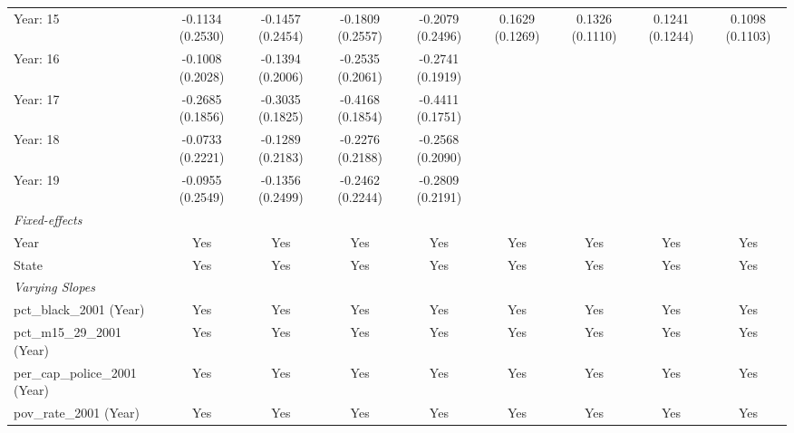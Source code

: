 \begin{tabular}{lcccccccc}
   Year: 15                            & -0.1134 (0.2530) & -0.1457 (0.2454) & -0.1809 (0.2557) & -0.2079 (0.2496) & 0.1629 (0.1269)  & 0.1326 (0.1110)  & 0.1241 (0.1244)  & 0.1098 (0.1103)\\   
   Year: 16                            & -0.1008 (0.2028) & -0.1394 (0.2006) & -0.2535 (0.2061) & -0.2741 (0.1919) &                  &                  &                  &   \\   
   Year: 17                            & -0.2685 (0.1856) & -0.3035 (0.1825) & -0.4168 (0.1854) & -0.4411 (0.1751) &                  &                  &                  &   \\   
   Year: 18                            & -0.0733 (0.2221) & -0.1289 (0.2183) & -0.2276 (0.2188) & -0.2568 (0.2090) &                  &                  &                  &   \\   
   Year: 19                            & -0.0955 (0.2549) & -0.1356 (0.2499) & -0.2462 (0.2244) & -0.2809 (0.2191) &                  &                  &                  &   \\   
   \midrule
   \emph{Fixed-effects}\\
   Year                                & Yes              & Yes              & Yes              & Yes              & Yes              & Yes              & Yes              & Yes\\  
   State                               & Yes              & Yes              & Yes              & Yes              & Yes              & Yes              & Yes              & Yes\\  
   \midrule
   \emph{Varying Slopes}\\
   pct\_black\_2001 (Year)             & Yes              & Yes              & Yes              & Yes              & Yes              & Yes              & Yes              & Yes\\  
   pct\_m15\_29\_2001 (Year)           & Yes              & Yes              & Yes              & Yes              & Yes              & Yes              & Yes              & Yes\\  
   per\_cap\_police\_2001 (Year)       & Yes              & Yes              & Yes              & Yes              & Yes              & Yes              & Yes              & Yes\\  
   pov\_rate\_2001 (Year)              & Yes              & Yes              & Yes              & Yes              & Yes              & Yes              & Yes              & Yes\\  

\end{tabular}
